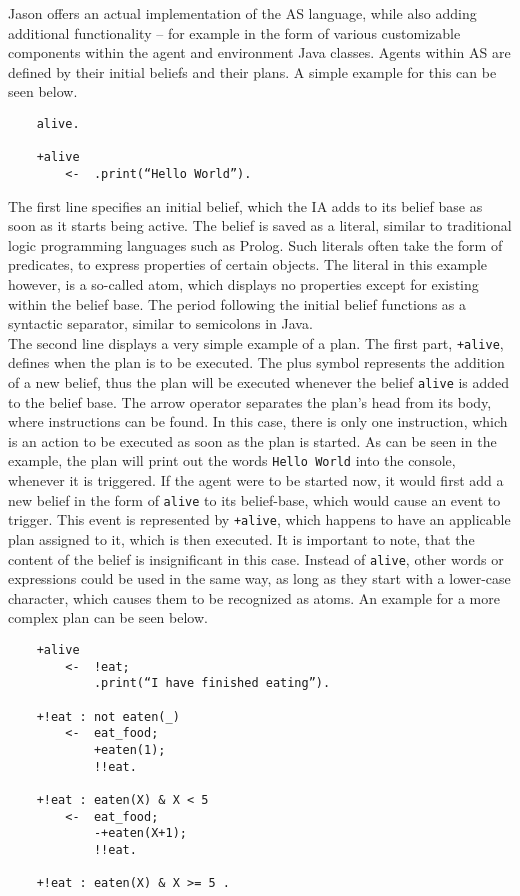 \documentclass[draft,final]{vutinfth} %
\begin{document}
Jason offers an actual implementation of the AS language, while also adding additional functionality – for example in the form of various customizable components within the agent and environment Java classes. 
Agents within AS are defined by their initial beliefs and their plans. 
A simple example for this can be seen below.
\begin{verbatim}
    alive.
		
    +alive 
	    <-  .print(“Hello World”).
\end{verbatim}
The first line specifies an initial belief, which the IA adds to its belief base as soon as it starts being active. 
The belief is saved as a literal, similar to traditional logic programming languages such as Prolog. 
Such literals often take the form of predicates, to express properties of certain objects. 
The literal in this example however, is a so-called atom, which displays no properties except for existing within the belief base. 
The period following the initial belief functions as a syntactic separator, similar to semicolons in Java. \\
The second line displays a very simple example of a plan. 
The first part, \verb|+alive|, defines when the plan is to be executed. 
The plus symbol represents the addition of a new belief, thus the plan will be executed whenever the belief \verb|alive| is added to the belief base. 
The arrow operator separates the plan’s head from its body, where instructions can be found. 
In this case, there is only one instruction, which is an action to be executed as soon as the plan is started. 
As can be seen in the example, the plan will print out the words \verb|Hello World| into the console, whenever it is triggered. 
If the agent were to be started now, it would first add a new belief in the form of \verb|alive| to its belief-base, which would cause an event to trigger. 
This event is represented by \verb|+alive|, which happens to have an applicable plan assigned to it, which is then executed. 
It is important to note, that the content of the belief is insignificant in this case. 
Instead of \verb|alive|, other words or expressions could be used in the same way, as long as they start with a lower-case character, which causes them to be recognized as atoms.
An example for a more complex plan can be seen below.
\begin{verbatim}
    +alive 
        <-  !eat;
            .print(“I have finished eating”).

    +!eat : not eaten(_)
        <-  eat_food;
            +eaten(1);
            !!eat.

    +!eat : eaten(X) & X < 5
        <-  eat_food;
            -+eaten(X+1);
            !!eat.

    +!eat : eaten(X) & X >= 5 .
\end{verbatim}
\end{document}
